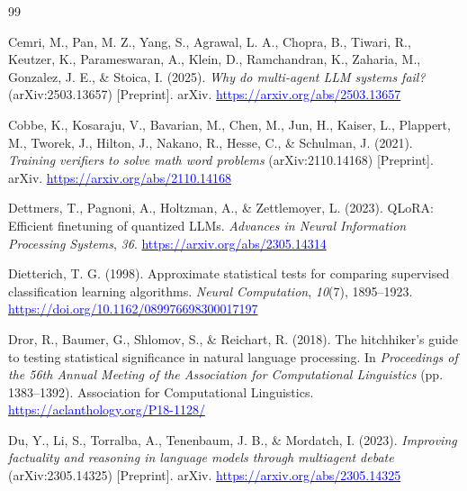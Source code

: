 \documentclass[11pt]{article}
\begin{document}
\begin{thebibliography}{99}

Cemri, M., Pan, M. Z., Yang, S., Agrawal, L. A., Chopra, B., Tiwari, R., Keutzer, K.,
Parameswaran, A., Klein, D., Ramchandran, K., Zaharia, M., Gonzalez, J. E., \& Stoica, I.
(2025). \textit{Why do multi-agent LLM systems fail?} (arXiv:2503.13657) [Preprint]. arXiv.
\href{https://arxiv.org/abs/2503.13657}{\textcolor{blue}{https://arxiv.org/abs/2503.13657}}

Cobbe, K., Kosaraju, V., Bavarian, M., Chen, M., Jun, H., Kaiser, L., Plappert, M.,
Tworek, J., Hilton, J., Nakano, R., Hesse, C., \& Schulman, J. (2021).
\textit{Training verifiers to solve math word problems} (arXiv:2110.14168) [Preprint]. arXiv.
\href{https://arxiv.org/abs/2110.14168}{\textcolor{blue}{https://arxiv.org/abs/2110.14168}}

Dettmers, T., Pagnoni, A., Holtzman, A., \& Zettlemoyer, L. (2023). QLoRA: Efficient
finetuning of quantized LLMs. \textit{Advances in Neural Information Processing Systems},
\textit{36}.
\href{https://arxiv.org/abs/2305.14314}{\textcolor{blue}{https://arxiv.org/abs/2305.14314}}

Dietterich, T. G. (1998). Approximate statistical tests for comparing supervised
classification learning algorithms. \textit{Neural Computation}, \textit{10}(7),
1895--1923.
\href{https://doi.org/10.1162/089976698300017197}{\textcolor{blue}{https://doi.org/10.1162/089976698300017197}}

Dror, R., Baumer, G., Shlomov, S., \& Reichart, R. (2018). The hitchhiker's guide to
testing statistical significance in natural language processing. In \textit{Proceedings of
the 56th Annual Meeting of the Association for Computational Linguistics} (pp. 1383--1392).
Association for Computational Linguistics.
\href{https://aclanthology.org/P18-1128/}{\textcolor{blue}{https://aclanthology.org/P18-1128/}}

Du, Y., Li, S., Torralba, A., Tenenbaum, J. B., \& Mordatch, I. (2023).
\textit{Improving factuality and reasoning in language models through multiagent debate}
(arXiv:2305.14325) [Preprint]. arXiv.
\href{https://arxiv.org/abs/2305.14325}{\textcolor{blue}{https://arxiv.org/abs/2305.14325}}


\end{thebibliography}
\end{document}
